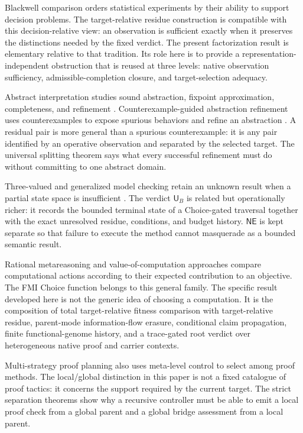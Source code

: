 \documentclass[10pt]{article}
\newcommand{\UB}{\mathsf{U}_B}
\newcommand{\NE}{\mathsf{NE}}
\begin{document}
Blackwell comparison orders statistical experiments by their ability to support decision problems.  The target-relative residue construction is compatible with this decision-relative view: an observation is sufficient exactly when it preserves the distinctions needed by the fixed verdict.  The present factorization result is elementary relative to that tradition.  Its role here is to provide a representation-independent obstruction that is reused at three levels: native observation sufficiency, admissible-completion closure, and target-selection adequacy.

Abstract interpretation studies sound abstraction, fixpoint approximation, completeness, and refinement \cite{cousotcousot1977}.  Counterexample-guided abstraction refinement uses counterexamples to expose spurious behaviors and refine an abstraction \cite{clarke2000}.  A residual pair is more general than a spurious counterexample: it is any pair identified by an operative observation and separated by the selected target.  The universal splitting theorem says what every successful refinement must do without committing to one abstract domain.

Three-valued and generalized model checking retain an unknown result when a partial state space is insufficient \cite{brunsgodefroid1999,brunsgodefroid2000}.  The verdict $\UB$ is related but operationally richer: it records the bounded terminal state of a Choice-gated traversal together with the exact unresolved residue, conditions, and budget history.  $\NE$ is kept separate so that failure to execute the method cannot masquerade as a bounded semantic result.

Rational metareasoning and value-of-computation approaches compare computational actions according to their expected contribution to an objective.  The FMI Choice function belongs to this general family.  The specific result developed here is not the generic idea of choosing a computation.  It is the composition of total target-relative fitness comparison with target-relative residue, parent-mode information-flow erasure, conditional claim propagation, finite functional-genome history, and a trace-gated root verdict over heterogeneous native proof and carrier contexts.

Multi-strategy proof planning also uses meta-level control to select among proof methods.  The local/global distinction in this paper is not a fixed catalogue of proof tactics: it concerns the support required by the current target.  The strict separation theorems show why a recursive controller must be able to emit a local proof check from a global parent and a global bridge assessment from a local parent.
\end{document}
